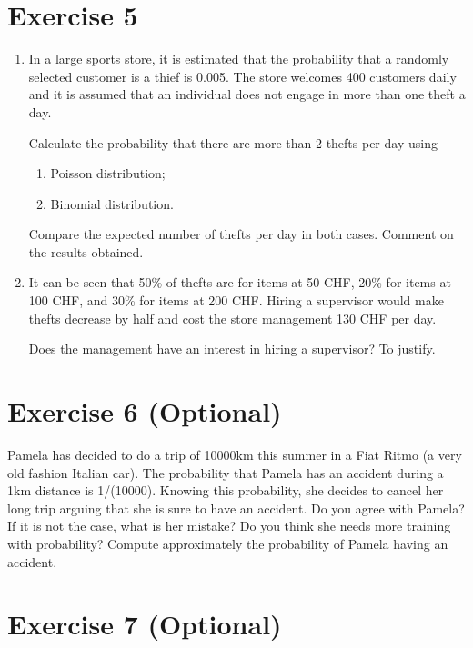 \documentclass[12pt,thmsa]{article}
\begin{document}
\section*{Exercise 5}

\begin{enumerate}%

\item In a large sports store, it is estimated that the probability that a randomly selected customer is a thief is 0.005. The store welcomes 400 customers daily and it is assumed that an individual does not engage in more than one theft a day.

\noindent Calculate the probability that there are more than 2 thefts per day using
\begin{enumerate}
\item Poisson distribution;
\item Binomial distribution.
\end{enumerate}

\noindent Compare the expected number of thefts per day in both cases. Comment on the results obtained.

\item It can be seen that 50\% of thefts are for items at 50 CHF, 20\% for items at 100 CHF, and 30\% for items at 200 CHF. Hiring a supervisor would make thefts decrease by half and cost the store management 130 CHF per day.

\noindent Does the management have an interest in hiring a supervisor? To justify.

\end{enumerate}

\newpage

\section*{Exercise 6 (Optional)}

Pamela has decided to do a trip of 10000km this summer in a Fiat Ritmo (a very old fashion Italian car). The probability that Pamela has an accident during a 1km distance is 1/(10000).
Knowing this probability, she decides to cancel her long trip arguing that she is sure to have an accident. Do you agree with Pamela? If it is not the case, what is her mistake? Do you think she needs more training with probability? Compute approximately the probability of Pamela having an accident.


\section*{Exercise 7 (Optional)}
\end{document}
